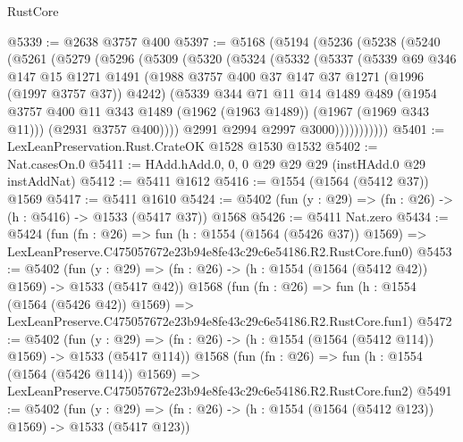 \begin{lexlean}{RustCore}
\begin{coremodule}
@5339 := @2638 @3757 @400
@5397 := @5168
    (@5194
      (@5236
        (@5238
          (@5240
            (@5261
              (@5279
                (@5296
                  (@5309
                    (@5320
                      (@5324
                        (@5332
                          (@5337
                            (@5339
                              @69
                              @346
                              @147
                              @15
                              @1271
                              @1491
                              (@1988 @3757 @400 @37 @147 @37 @1271 (@1996 (@1997 @3757 @37)) @4242)
                              (@5339
                                @344
                                @71
                                @11
                                @14
                                @1489
                                @489
                                (@1954
                                  @3757
                                  @400
                                  @11
                                  @343
                                  @1489
                                  (@1962 (@1963 @1489))
                                  (@1967 (@1969 @343 @11)))
                                (@2931 @3757 @400))))
                          @2991
                          @2994
                          @2997
                          @3000)))))))))))
@5401 := LexLeanPreservation.Rust.CrateOK @1528 @1530 @1532
@5402 := Nat.casesOn.{0}
@5411 := HAdd.hAdd.{0, 0, 0} @29 @29 @29 (instHAdd.{0} @29 instAddNat)
@5412 := @5411 @1612
@5416 := @1554 (@1564 (@5412 @37)) @1569
@5417 := @5411 @1610
@5424 := @5402 (fun (y : @29) => (fn : @26) -> (h : @5416) -> @1533 (@5417 @37)) @1568
@5426 := @5411 Nat.zero
@5434 := @5424
    (fun (fn : @26) =>
    fun (h : @1554 (@1564 (@5426 @37)) @1569) =>
    LexLeanPreserve.C475057672e23b94e8fe43c29c6e54186.R2.RustCore.fun0)
@5453 := @5402
    (fun (y : @29) => (fn : @26) -> (h : @1554 (@1564 (@5412 @42)) @1569) -> @1533 (@5417 @42))
    @1568
    (fun (fn : @26) =>
    fun (h : @1554 (@1564 (@5426 @42)) @1569) =>
    LexLeanPreserve.C475057672e23b94e8fe43c29c6e54186.R2.RustCore.fun1)
@5472 := @5402
    (fun (y : @29) => (fn : @26) -> (h : @1554 (@1564 (@5412 @114)) @1569) -> @1533 (@5417 @114))
    @1568
    (fun (fn : @26) =>
    fun (h : @1554 (@1564 (@5426 @114)) @1569) =>
    LexLeanPreserve.C475057672e23b94e8fe43c29c6e54186.R2.RustCore.fun2)
@5491 := @5402
    (fun (y : @29) => (fn : @26) -> (h : @1554 (@1564 (@5412 @123)) @1569) -> @1533 (@5417 @123))

\end{coremodule}
\end{lexlean}
